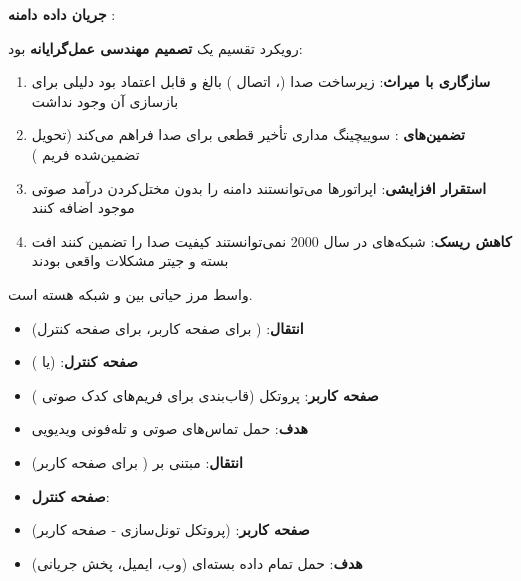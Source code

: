 
\textbf{جریان داده دامنه }:



رویکرد تقسیم  یک \textbf{تصمیم مهندسی عمل‌گرایانه} بود:

\begin{enumerate}
\def\labelenumi{\arabic{enumi}.}
\tightlist
\item
  \textbf{سازگاری با میراث}: زیرساخت صدا (، اتصال ) بالغ و قابل اعتماد بود  دلیلی برای بازسازی آن وجود نداشت
\item
  \textbf{تضمین‌های }: سوییچینگ مداری تأخیر قطعی برای صدا فراهم می‌کند (تحویل تضمین‌شده فریم )
\item
  \textbf{استقرار افزایشی}: اپراتورها می‌توانستند دامنه  را بدون مختل‌کردن درآمد صوتی موجود اضافه کنند
\item
  \textbf{کاهش ریسک}: شبکه‌های  در سال 2000 نمی‌توانستند کیفیت صدا را تضمین کنند  افت بسته و جیتر مشکلات واقعی بودند
\end{enumerate}


واسط  مرز حیاتی بین  و شبکه هسته است.


\begin{itemize}
\tightlist
\item
  \textbf{انتقال}:  ( برای صفحه کاربر،  برای صفحه کنترل)
\item
  \textbf{صفحه کنترل}:  (یا )
\item
  \textbf{صفحه کاربر}: پروتکل  (قاب‌بندی برای فریم‌های کدک صوتی )
\item
  \textbf{هدف}: حمل تماس‌های صوتی و تله‌فونی ویدیویی
\end{itemize}


\begin{itemize}
\tightlist
\item
  \textbf{انتقال}: مبتنی بر  ( برای صفحه کاربر)
\item
  \textbf{صفحه کنترل}: 
\item
  \textbf{صفحه کاربر}:  (پروتکل تونل‌سازی  - صفحه کاربر)
\item
  \textbf{هدف}: حمل تمام داده بسته‌ای (وب، ایمیل، پخش جریانی)
\end{itemize}

